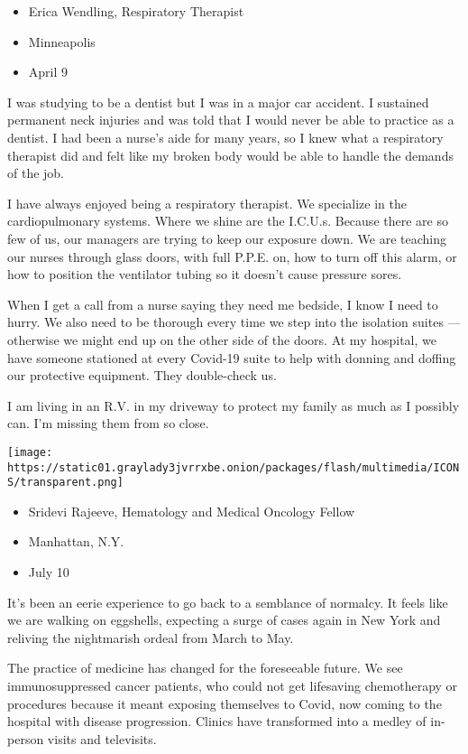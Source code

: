 \begin{itemize}
\tightlist
\item
  Erica Wendling, Respiratory Therapist
\item
  Minneapolis
\item
  April 9
\end{itemize}

I was studying to be a dentist but I was in a major car accident. I
sustained permanent neck injuries and was told that I would never be
able to practice as a dentist. I had been a nurse's aide for many years,
so I knew what a respiratory therapist did and felt like my broken body
would be able to handle the demands of the job.

I have always enjoyed being a respiratory therapist. We specialize in
the cardiopulmonary systems. Where we shine are the I.C.U.s. Because
there are so few of us, our managers are trying to keep our exposure
down. We are teaching our nurses through glass doors, with full P.P.E.
on, how to turn off this alarm, or how to position the ventilator tubing
so it doesn't cause pressure sores.

When I get a call from a nurse saying they need me bedside, I know I
need to hurry. We also need to be thorough every time we step into the
isolation suites --- otherwise we might end up on the other side of the
doors. At my hospital, we have someone stationed at every Covid-19 suite
to help with donning and doffing our protective equipment. They
double-check us.

I am living in an R.V. in my driveway to protect my family as much as I
possibly can. I'm missing them from so close.

\texttt{[image: https://static01.graylady3jvrrxbe.onion/packages/flash/multimedia/ICONS/transparent.png]}

\begin{itemize}
\tightlist
\item
  Sridevi Rajeeve, Hematology and Medical Oncology Fellow
\item
  Manhattan, N.Y.
\item
  July 10
\end{itemize}

It's been an eerie experience to go back to a semblance of normalcy. It
feels like we are walking on eggshells, expecting a surge of cases again
in New York and reliving the nightmarish ordeal from March to May.

The practice of medicine has changed for the foreseeable future. We see
immunosuppressed cancer patients, who could not get lifesaving
chemotherapy or procedures because it meant exposing themselves to
Covid, now coming to the hospital with disease progression. Clinics have
transformed into a medley of in-person visits and televisits.

